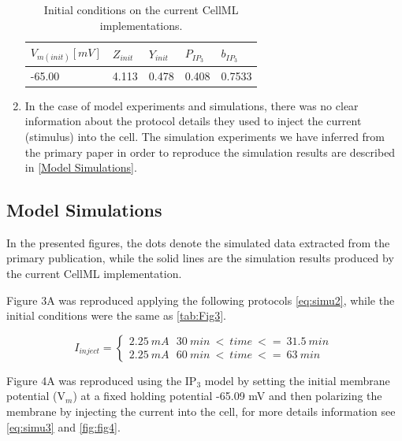 \documentclass[fleqn,10pt]{physiome}
\begin{document}
\begin{enumerate}
\begin{table}[hbt!]

\centering
\caption{Initial conditions on the current CellML implementations.}\label{tab:Fig3}
\begin{tabular}{lllll}\hline

$V_{m(init)}[mV]$ & $Z_{init}$ & $Y_{init}$ & $P_{IP_{3}}$ & $b_{IP_{3}}$\\ \hline
-65.00 & 4.113 & 0.478 & 0.408 & 0.7533\\
\end{tabular}
\end{table}

\item  In the case of model experiments and simulations, there was no clear information about the protocol details they used to inject the current (stimulus) into the cell. The simulation experiments we have inferred from the primary paper in order to reproduce the simulation results are described in \autoref{Model Simulations}. 

\end{enumerate}

\subsection{Model Simulations}
\label{Model Simulations}
In the presented figures, the dots denote the simulated data extracted from the primary publication, while the solid lines are the simulation results produced by the current CellML implementation.


Figure 3A was reproduced applying the following protocols \autoref{eq:simu2}, while the initial conditions were the same as \autoref{tab:Fig3}.


\begin{equation}
  I_{inject} =
 \begin{cases}
 2.25\ mA  \  \ \   30\ min\ < \ time \ <= \ 31.5\ min\  \\
 2.25\ mA  \  \ \   60\ min\ < \ time \ <= \ 63\ min\ 
 \label{eq:simu2}

  \end{cases}
\end{equation}

Figure 4A was reproduced using the IP$_{3}$ model by setting the initial membrane potential (V$_{m}$) at a fixed holding potential -65.09 mV and then polarizing the membrane by injecting the current into the cell, for more details information see \autoref{eq:simu3} and \autoref{fig:fig4}. 
\end{document}
